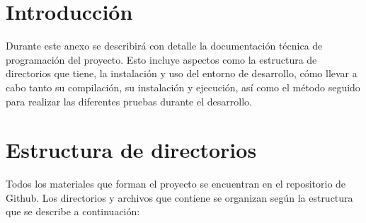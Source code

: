 
\section{Introducción}
Durante este anexo se describirá con detalle la documentación técnica de programación del proyecto. Esto incluye aspectos como la estructura de directorios que tiene, la instalación y uso del entorno de desarrollo, cómo llevar a cabo tanto su compilación, su instalación y ejecución, así como el método seguido para realizar las diferentes pruebas durante el desarrollo.
\section{Estructura de directorios}
Todos los materiales que forman el proyecto se encuentran en el repositorio de Github. Los directorios y archivos que contiene se organizan según la estructura que se describe a continuación:
